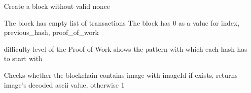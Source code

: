 \documentclass[letterpaper,10pt,english]{sphinxmanual}
\begin{document}
\begin{fulllineitems}
\begin{fulllineitems}
\end{fulllineitems}


\begin{fulllineitems}
\label{\detokenize{index:blockchain.Blockchain.create_naked_block}}
Create a block without valid nonce

\end{fulllineitems}


\begin{fulllineitems}
\label{\detokenize{index:blockchain.Blockchain.create_origin_block}}
The block has empty list of transactions
The block has 0 as a value for index, previous\_hash, proof\_of\_work

\end{fulllineitems}


\begin{fulllineitems}
\label{\detokenize{index:blockchain.Blockchain.difficultyPattern}}
difficulty level of the Proof of Work
shows the pattern with which each hash has to start with

\end{fulllineitems}


\begin{fulllineitems}
\label{\detokenize{index:blockchain.Blockchain.find_image}}
Checks whether the blockchain contains image with imageId
if exists, returns image’s decoded ascii value, otherwise \sphinxhyphen{}1


\end{fulllineitems}
\end{fulllineitems}
\end{document}
